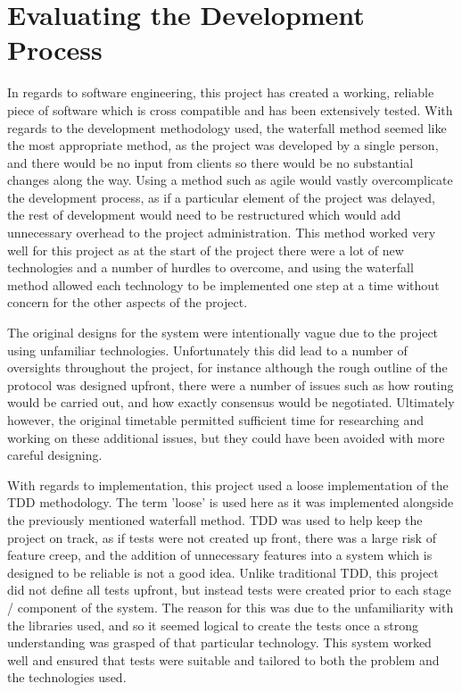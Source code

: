 \documentclass[a4paper, 11pt]{report}
\begin{document}
\section{Evaluating the Development Process}
In regards to software engineering, this project has created a working, reliable piece of software which is cross compatible and has been extensively tested. With regards to the development methodology used, the waterfall method seemed like the most appropriate method, as the project was developed by a single person, and there would be no input from clients so there would be no substantial changes along the way. Using a method such as agile would vastly overcomplicate the development process, as if a particular element of the project was delayed, the rest of development would need to be restructured which would add unnecessary overhead to the project administration. This method worked very well for this project as at the start of the project there were a lot of new technologies and a number of hurdles to overcome, and using the waterfall method allowed each technology to be implemented one step at a time without concern for the other aspects of the project.

The original designs for the system were intentionally vague due to the project using unfamiliar technologies. Unfortunately this did lead to a number of oversights throughout the project, for instance although the rough outline of the protocol was designed upfront, there were a number of issues such as how routing would be carried out, and how exactly consensus would be negotiated. Ultimately however, the original timetable permitted sufficient time for researching and working on these additional issues, but they could have been avoided with more careful designing.

With regards to implementation, this project used a loose implementation of the \acrfull{TDD} methodology. The term 'loose' is used here as it was implemented alongside the previously mentioned waterfall method. \acrshort{TDD} was used to help keep the project on track, as if tests were not created up front, there was a large risk of feature creep, and the addition of unnecessary features into a system which is designed to be reliable is not a good idea. Unlike traditional \acrshort{TDD}, this project did not define all tests upfront, but instead tests were created prior to each stage / component of the system. The reason for this was due to the unfamiliarity with the libraries used, and so it seemed logical to create the tests once a strong understanding was grasped of that particular technology. This system worked well and ensured that tests were suitable and tailored to both the problem and the technologies used.
\end{document}

